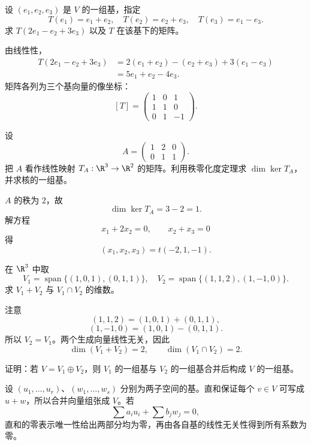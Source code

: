 \begin{exercise}[level=basic]
设 $(e_1,e_2,e_3)$ 是 $V$ 的一组基，指定
\[
T(e_1)=e_1+e_2,\quad
T(e_2)=e_2+e_3,\quad
T(e_3)=e_1-e_3.
\]
求 $T(2e_1-e_2+3e_3)$ 以及 $T$ 在该基下的矩阵。
\begin{solution}
由线性性，
\begin{align*}
T(2e_1-e_2+3e_3)
&=2(e_1+e_2)-(e_2+e_3)+3(e_1-e_3)\\
&=5e_1+e_2-4e_3.
\end{align*}
矩阵各列为三个基向量的像坐标：
\[
[T]=
\begin{pmatrix}
1&0&1\\
1&1&0\\
0&1&-1
\end{pmatrix}.
\]
\end{solution}
\end{exercise}

\begin{exercise}[level=basic]
设
\[
A=\begin{pmatrix}1&2&0\\0&1&1\end{pmatrix}.
\]
把 $A$ 看作线性映射 $T_A:\R^3\to\R^2$ 的矩阵。利用秩零化度定理求 $\dim\ker T_A$，并求核的一组基。
\begin{solution}
$A$ 的秩为 $2$，故
\[
\dim\ker T_A=3-2=1.
\]
解方程
\[
x_1+2x_2=0,\qquad x_2+x_3=0
\]
得
\[
(x_1,x_2,x_3)=t(-2,1,-1).
\]
\end{solution}
\end{exercise}

\begin{exercise}[level=basic]
在 $\R^3$ 中取
\[
V_1=\operatorname{span}\{(1,0,1),(0,1,1)\},
\quad
V_2=\operatorname{span}\{(1,1,2),(1,-1,0)\}.
\]
求 $V_1+V_2$ 与 $V_1\cap V_2$ 的维数。
\begin{solution}
注意
\[
(1,1,2)=(1,0,1)+(0,1,1),
\]
\[
(1,-1,0)=(1,0,1)-(0,1,1).
\]
所以 $V_2=V_1$。两个生成向量线性无关，因此
\[
\dim(V_1+V_2)=2,\qquad
\dim(V_1\cap V_2)=2.
\]
\end{solution}
\end{exercise}

\begin{exercise}[level=basic]
证明：若 $V=V_1\oplus V_2$，则 $V_1$ 的一组基与 $V_2$ 的一组基合并后构成 $V$ 的一组基。
\begin{solution}
设 $(u_1,\ldots,u_r)$、$(w_1,\ldots,w_s)$ 分别为两子空间的基。直和保证每个 $v\in V$ 可写成 $u+w$，所以合并向量组张成 $V$。若
\[
\sum a_iu_i+\sum b_jw_j=0,
\]
直和的零表示唯一性给出两部分均为零，再由各自基的线性无关性得到所有系数为零。
\end{solution}
\end{exercise}


